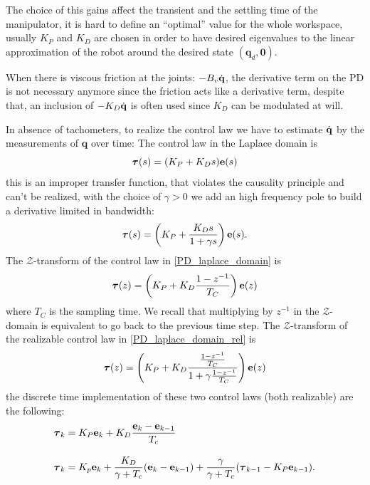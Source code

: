 \documentclass[10pt, a4paper]{report}
\newcommand{\q}{{\mathbf q}}
\begin{document}
The choice of this gains affect the transient and the settling time of the manipulator, it is hard to define an ``optimal'' value for the whole workspace, usually $K_P$ and $K_D$ are chosen in order to have desired eigenvalues to the linear approximation of the robot around the desired state $(\q_d,\mathbf 0)$.

When there is viscous friction at the joints: $-B_v{\dot{\mathbf q}}$, the derivative term on the PD is not necessary anymore since the friction acts like a derivative term, despite that, an inclusion of $-K_D{\dot{\mathbf q}}$ is often used since $K_D$ can be modulated at will.\bigskip 

In absence of tachometers, to realize the control law we have to estimate ${\dot{\mathbf q}}$ by the measurements of $\q$ over time: The control law in the Laplace domain is\begin{equation}\label{PD_laplace_domain}
    {\boldsymbol{\tau}}(s)=(K_P+K_Ds)\mathbf e(s)
\end{equation}
this is an improper transfer function, that violates the causality principle and can't be realized, with the choice of $\gamma>0$ we add an high frequency pole to build a derivative limited in bandwidth:\begin{equation}\label{PD_laplace_domain_rel}
     {\boldsymbol{\tau}}(s)=\left(K_P+\frac{K_Ds}{1+\gamma s}\right)\mathbf e(s).
\end{equation}
The $\mathcal Z$-transform of the control law  in \eqref{PD_laplace_domain} is\begin{equation}
    {\boldsymbol{\tau}}(z)=\left(
        K_P+K_D\frac{1-z^{-1}}{T_C}
    \right)\mathbf e(z)
\end{equation}
where $T_C$ is the sampling time. We recall that multiplying by $z^{-1}$ in the $\mathcal Z$-domain is equivalent to go back to the previous time step. The $\mathcal Z$-transform of the realizable control law in \eqref{PD_laplace_domain_rel} is\begin{equation}
    {\boldsymbol{\tau}}(z)=\left(
        K_P+K_D\frac{\frac{1-z^{-1}}{T_C}}{1+\gamma\frac{1-z^{-1}}{T_C}}
    \right)\mathbf e(z)
\end{equation}
the discrete time implementation of these two control laws (both realizable) are the following:\begin{align}
    &{\boldsymbol{\tau}}_k=K_P\mathbf e_k+K_D\frac{\mathbf e_k-\mathbf e_{k-1}}{T_c}\\[2ex]
    &{\boldsymbol{\tau}}_k=K_p\mathbf e_k+\frac{K_D}{\gamma+T_c}(\mathbf e_k-\mathbf e_{k-1})+\frac{\gamma}{\gamma+T_c}({\boldsymbol{\tau}}_{k-1}-K_P\mathbf e_{k-1}).
\end{align}
\end{document}

